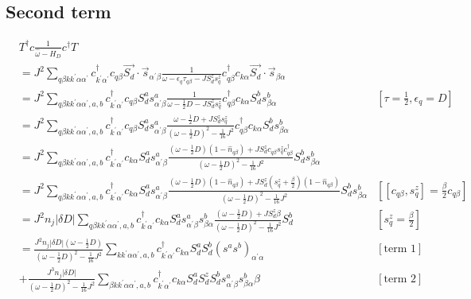 \documentclass{revtex4-2}
\begin{document}
\subsection{Second term}
\begin{align}
	&T^\dagger c \frac{1}{\hat \omega - H_D}c^\dagger T \\
	&= J^2\sum_{q\beta k k^\prime \alpha \alpha^\prime} c^\dagger_{k^\prime\alpha^\prime} c_{q\beta} \vec{S_d}\cdot\vec{s}_{\alpha^\prime \beta } \frac{1}{\omega - \epsilon_q\tau_{q\beta} - J S_d^z s_q^z}c^\dagger_{q\beta} c_{k\alpha} \vec{S_d}\cdot\vec{s}_{ \beta\alpha}\\
	&= J^2\sum_{q\beta k k^\prime \alpha \alpha^\prime,a,b} c^\dagger_{k^\prime\alpha^\prime} c_{q\beta} S_d^a s^a_{\alpha^\prime \beta} \frac{1}{\omega - \frac{1}{2}D - J S_d^z s_q^z}c^\dagger_{q\beta} c_{k\alpha} S_d^b s^b_{\beta \alpha} & \left[\tau = \frac{1}{2}, \epsilon_q = D\right] \\
	&= J^2\sum_{q\beta k k^\prime \alpha \alpha^\prime,a,b} c^\dagger_{k^\prime\alpha^\prime} c_{q\beta} S_d^a s^a_{\alpha^\prime \beta} \frac{\omega - \frac{1}{2}D + J S_d^z s_q^z}{\left(\omega - \frac{1}{2}D\right)^2 - \frac{1}{16}J^2}c^\dagger_{q\beta} c_{k\alpha} S_d^b s^b_{\beta \alpha} \\
	&= J^2\sum_{q\beta k k^\prime \alpha \alpha^\prime,a,b} c^\dagger_{k^\prime\alpha^\prime} c_{k\alpha} S_d^a s^a_{\alpha^\prime \beta} \frac{\left(\omega - \frac{1}{2}D\right) \left(1 - \hat n_{q\beta}\right) +  J S_d^z c_{q\beta} s_q^z c^\dagger_{q\beta}}{\left(\omega - \frac{1}{2}D\right)^2 - \frac{1}{16}J^2} S_d^b s^b_{\beta \alpha} \\
	&= J^2\sum_{q\beta k k^\prime \alpha \alpha^\prime,a,b} c^\dagger_{k^\prime\alpha^\prime} c_{k\alpha} S_d^a s^a_{\alpha^\prime \beta} \frac{\left(\omega - \frac{1}{2}D\right) \left(1 - \hat n_{q\beta}\right) +  J S_d^z \left(s_q^z + \frac{\beta}{2}\right) \left(1- \hat n_{q\beta}\right)}{\left(\omega - \frac{1}{2}D\right)^2 - \frac{1}{16}J^2} S_d^b s^b_{\beta \alpha} & \left[\left[c_{q\beta}, s_q^z\right] = \frac{\beta}{2} c_{q\beta}\right] \\
	&= J^2 n_j |\delta D|\sum_{q\beta k k^\prime \alpha \alpha^\prime,a,b} c^\dagger_{k^\prime\alpha^\prime} c_{k\alpha} S_d^a s^a_{\alpha^\prime \beta}s^b_{\beta \alpha} \frac{\left(\omega - \frac{1}{2}D\right) + J S_d^z \beta}{\left(\omega - \frac{1}{2}D\right)^2 - \frac{1}{16}J^2} S_d^b & \left[s_q^z = \frac{\beta}{2}\right]  \\
	&= \frac{J^2 n_j |\delta D|\left(\omega - \frac{1}{2}D\right)}{\left(\omega - \frac{1}{2}D\right)^2 - \frac{1}{16}J^2} \sum_{k k^\prime \alpha \alpha^\prime,a,b} c^\dagger_{k^\prime\alpha^\prime} c_{k\alpha} S_d^a  S_d^b \left(s^a s^b\right)_{\alpha^\prime \alpha} & \left[\text{term 1}\right]\\
	&+ \frac{J^3 n_j |\delta D|}{\left(\omega - \frac{1}{2}D\right)^2 - \frac{1}{16}J^2} \sum_{\beta k k^\prime \alpha \alpha^\prime,a,b} c^\dagger_{k^\prime\alpha^\prime} c_{k\alpha} S_d^a S_d^z S_d^b s^a_{\alpha^\prime \beta} s^b_{\beta \alpha} \beta & \left[\text{term 2}\right] \\
\end{align}
\end{document}
